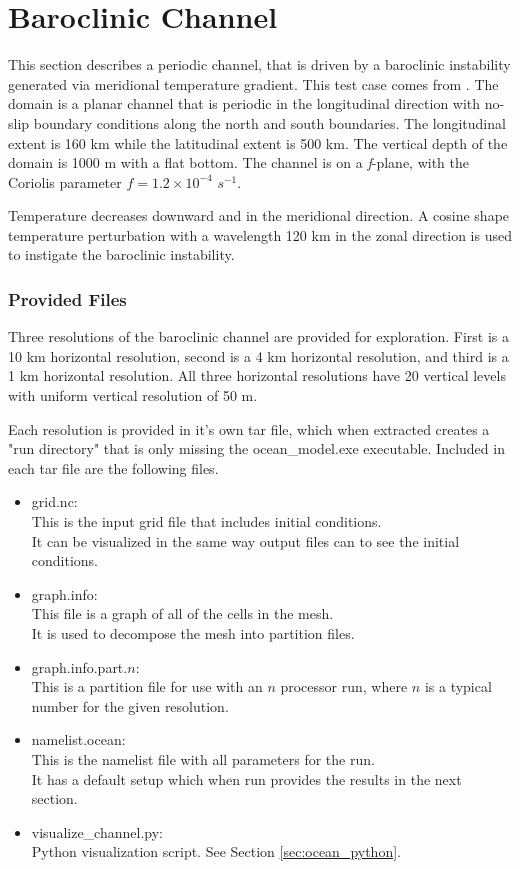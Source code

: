\section{Baroclinic Channel}
\label{subsec:baroclinic_channel_description}
This section describes a periodic channel, that is driven by a baroclinic
instability generated via meridional temperature gradient. This test case comes from
\cite{Ilicak_ea12om}. The domain is a planar channel that is periodic in the
longitudinal direction with no-slip boundary conditions along the north and
south boundaries. The longitudinal extent is 160 km while the
latitudinal extent is 500 km. The vertical depth of the domain is 1000 m with a
flat bottom. The channel is on a {\it f}-plane, with the Coriolis parameter $f
= 1.2 \times 10^{-4}$ $s^{-1}$.

Temperature decreases downward and in the meridional direction. A cosine shape temperature
perturbation with a
wavelength 120 km in the zonal direction is used to instigate the baroclinic instability.

\subsubsection{Provided Files}
\label{subsubsec:baroclinic_channel_files}
Three resolutions of the baroclinic channel are provided for exploration. First
is a 10 km horizontal resolution, second is a 4 km horizontal resolution, and
third is a 1 km horizontal resolution. All three horizontal resolutions have 20
vertical levels with uniform vertical resolution of 50 m.

Each resolution is provided in it's own tar file, which when extracted creates
a "run directory" that is only missing the ocean\_model.exe executable.
Included in each tar file are the following files.

\begin{itemize}
	\item grid.nc: \\
		This is the input grid file that includes initial conditions.  \\
		It can be visualized in the same way output files can to see the initial conditions.
	\item graph.info: \\
		This file is a graph of all of the cells in the mesh. \\
		It is used to decompose the mesh into partition files.
	\item graph.info.part.$n$: \\
		This is a partition file for use with an $n$ processor run, where $n$ is a typical number for the given resolution.
	\item namelist.ocean: \\
		This is the namelist file with all parameters for the run. \\
		It has a default setup which when run provides the results in the next section.
	\item visualize\_channel.py: \\
		Python visualization script.  See Section \ref{sec:ocean_python}.
\end{itemize}

